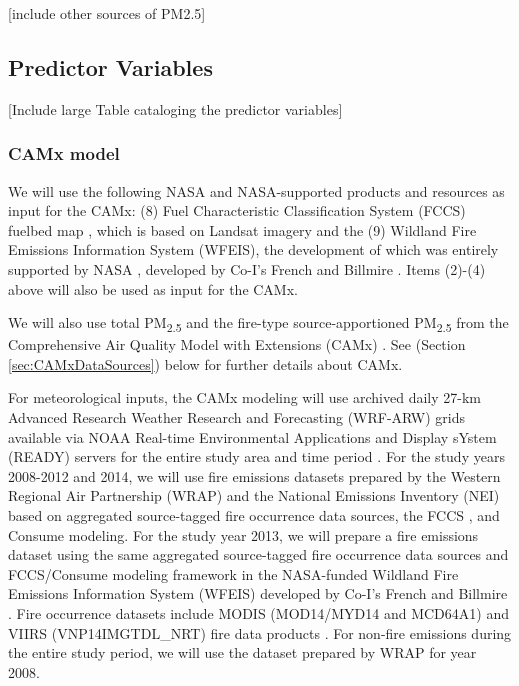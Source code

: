 \documentclass[authoryear]{elsarticle}
\begin{document}
[include other sources of PM2.5]

\subsection{Predictor Variables} %

[Include large Table cataloging the predictor variables]

\subsubsection{CAMx model} %

We will use the following NASA and NASA-supported products and resources as input for the CAMx: 
(8) Fuel Characteristic Classification System (FCCS) fuelbed map \citep{McKenzie2012}, which is based on Landsat imagery and the 
(9) Wildland Fire Emissions Information System (WFEIS), the development of which was entirely supported by NASA  \citep{WFEIS2017}, developed by Co-I's French and Billmire \citep{French2014}. Items (2)-(4) above will also be used as input for the CAMx.

We will also use total PM\textsubscript{2.5} and the fire-type source-apportioned PM\textsubscript{2.5} from the Comprehensive Air Quality Model with Extensions (CAMx) \citep{CAMx2017}. See  (Section \ref{sec:CAMxDataSources}) below for further details about CAMx. 

For meteorological inputs, the CAMx modeling will use archived daily 27-km Advanced Research Weather Research and Forecasting (WRF-ARW) grids available via NOAA Real-time Environmental Applications and Display sYstem (READY) servers for the entire study area and time period \citep{Wang2007,Rolph2017}. For the study years 2008-2012 and 2014, we will use fire emissions datasets prepared by the Western Regional Air Partnership (WRAP) and the National Emissions Inventory (NEI) \citep{EPANEI2017} based on aggregated source-tagged fire occurrence 
data sources, the FCCS \citep{Ottmar2007}, and Consume \citep{Prichard2009}
modeling. For the study year 2013, we will prepare a fire emissions dataset using the same aggregated source-tagged fire occurrence data sources and FCCS/Consume modeling framework in the NASA-funded  Wildland Fire Emissions Information System (WFEIS) \citep{WFEIS2017} developed by Co-I's French and Billmire \citep{French2014}. Fire occurrence datasets include MODIS  (MOD14/MYD14 and MCD64A1) and  VIIRS (VNP14IMGTDL\_NRT) fire data products \citep{Giglio2006,MODISBurnArea,Schroeder2014}. 
For non-fire emissions during the entire study period, we will use the dataset prepared by WRAP for year 2008.
\end{document}
